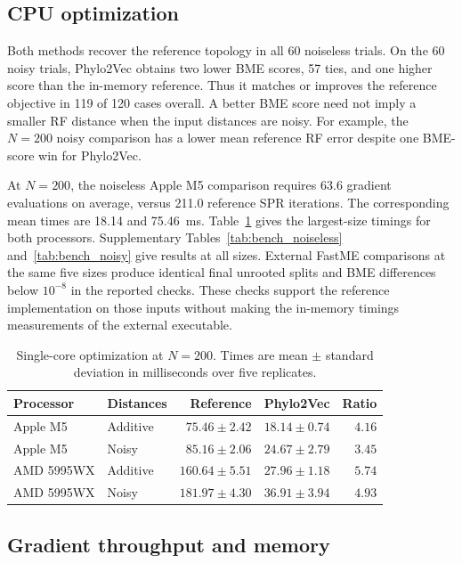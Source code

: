 \documentclass[11pt,a4paper]{article}
\makeatletter
\DeclareRobustCommand{\_}{\ifmmode\nfss@text{\textunderscore}\else\textunderscore\allowbreak\fi}
\theoremstyle{definition}
\makeatother
\begin{document}
\subsection{CPU optimization}

Both methods recover the reference topology in all 60 noiseless trials.
On the 60 noisy trials, Phylo2Vec obtains two lower BME scores, 57 ties, and one higher score than the in-memory reference.
Thus it matches or improves the reference objective in 119 of 120 cases overall.
A better BME score need not imply a smaller RF distance when the input distances are noisy.
For example, the $N=200$ noisy comparison has a lower mean reference RF error despite one BME-score win for Phylo2Vec.

At $N=200$, the noiseless Apple M5 comparison requires 63.6 gradient evaluations on average, versus 211.0 reference SPR iterations.
The corresponding mean times are 18.14 and 75.46~ms.
Table~\ref{tab:cpu_summary} gives the largest-size timings for both processors.
Supplementary Tables~\ref{tab:bench_noiseless} and~\ref{tab:bench_noisy} give results at all sizes.
External FastME comparisons at the same five sizes produce identical final unrooted splits and BME differences below $10^{-8}$ in the reported checks.
These checks support the reference implementation on those inputs without making the in-memory timings measurements of the external executable.

\begin{table}[tb]
\centering
\caption{Single-core optimization at $N=200$. Times are mean $\pm$ standard deviation in milliseconds over five replicates.}
\label{tab:cpu_summary}
\small
\begin{tabular}{@{}llrrr@{}}
\toprule
Processor & Distances & Reference & Phylo2Vec & Ratio\\
\midrule
Apple M5 & Additive & $75.46\pm2.42$ & $18.14\pm0.74$ & $4.16$\\
Apple M5 & Noisy & $85.16\pm2.06$ & $24.67\pm2.79$ & $3.45$\\
AMD 5995WX & Additive & $160.64\pm5.51$ & $27.96\pm1.18$ & $5.74$\\
AMD 5995WX & Noisy & $181.97\pm4.30$ & $36.91\pm3.94$ & $4.93$\\
\bottomrule
\end{tabular}
\end{table}

\subsection{Gradient throughput and memory}
\end{document}
